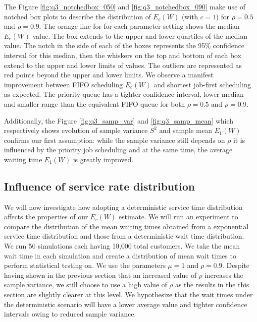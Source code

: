 \documentclass{article}
\begin{document}
    The Figure \ref{fig:q3_notchedbox_050} and \ref{fig:q3_notchedbox_090} make use of notched box plots to describe the distribution of $E_c(W)$ (with $c = 1$) for $\rho = 0.5$ and $\rho = 0.9$. The orange line for for each parameter setting shows the median $E_c(W)$ value. The box extends to the upper and lower quartiles of the median value. The notch in the side of each of the boxes represents the 95\% confidence interval for this median, then the whiskers on the top and bottom of each box extend to the upper and lower limits of values. The outliers are represented as red points beyond the upper and lower limits. We observe a manifest improvement between FIFO scheduling $E_c(W)$ and shortest job-first scheduling as expected. The priority queue has a tighter confidence interval, lower median and smaller range than the equivalent FIFO queue for both $\rho = 0.5$ and $\rho = 0.9$.


    Additionally, the Figure \ref{fig:q3_samp_var} and \ref{fig:q3_samp_mean} which respectively shows evolution of sample variance $S^2$ and sample mean $E_1(W)$ confirms our first assumption: while the sample variance still depends on $\rho$ it is influenced by the priority job scheduling and at the same time, the average waiting time $E_1(W)$ is greatly improved.

    \subsection*{Influence of service rate distribution}

    We will now investigate how adopting a deterministic service time distribution affects the properties of our $E_c(W)$ estimate. We will run an experiment to compare the distribution of the mean waiting times obtained from a exponential service time distribution and those from a deterministic wait time distribution. We run 50 simulations each having 10,000 total customers. We take the mean wait time in each simulation and create a distribution of mean wait times to perform statistical testing on. We use the parameters $\mu = 1$ and $\rho = 0.9$. Despite having shown in the previous section that an increased value of $\rho$ increases the sample variance, we still choose to use a high value of $\rho$ as the results in the this section are slightly clearer at this level. We hypothesize that the wait times under the deterministic scenario will have a lower average value and tighter confidence intervals owing to reduced sample variance.
\end{document}
